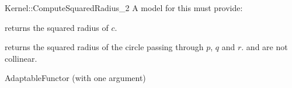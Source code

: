 \begin{ccRefFunctionObjectConcept}{Kernel::ComputeSquaredRadius_2}
A model for this must provide:


       {returns the squared radius of $c$. }

       {returns the squared radius of the circle passing through $p$, $q$
       and $r$. \ccPrecond {} and  are not collinear.}

\ccRefines
AdaptableFunctor (with one argument)

\ccSeeAlso
{} \\
  \\

\end{ccRefFunctionObjectConcept}
